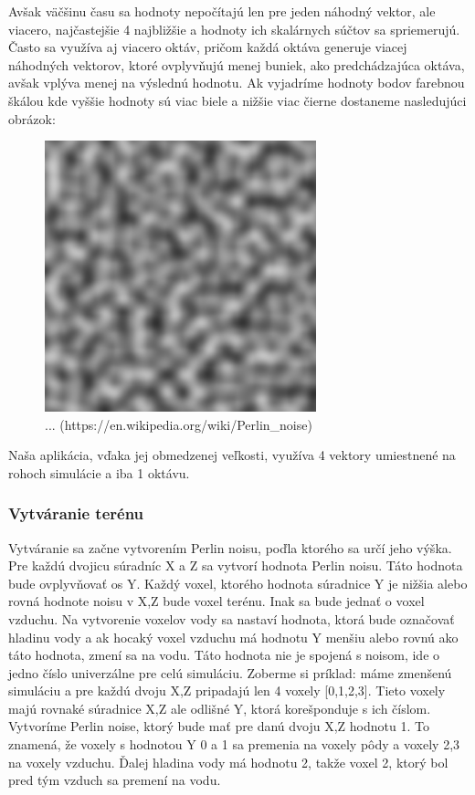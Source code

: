 \documentclass[12pt]{article}
\begin{document}
Avšak väčšinu času sa hodnoty nepočítajú len pre jeden náhodný vektor,
ale viacero, najčastejšie 4 najbližšie a hodnoty ich skalárnych súčtov
sa spriemerujú. Často sa využíva aj viacero oktáv, pričom každá oktáva generuje
viacej náhodných vektorov, ktoré ovplyvňujú menej buniek, ako predchádzajúca
oktáva, avšak vplýva menej na výslednú hodnotu. Ak vyjadríme hodnoty bodov
farebnou škálou kde vyššie hodnoty sú viac biele a nižšie viac čierne dostaneme
nasledujúci obrázok:

\begin{figure}[h]
	\centering
	\includegraphics[width=0.7\textwidth]{res/perlinov_sum_textura.png}
	\caption{... (https://en.wikipedia.org/wiki/Perlin\_noise)}
	\label{obr:perlinov sum textura}
\end{figure}

Naša aplikácia, vďaka jej obmedzenej veľkosti, využíva 4 vektory umiestnené
na rohoch simulácie a iba 1 oktávu.

\subsubsection{Vytváranie terénu}

Vytváranie sa začne vytvorením Perlin noisu, poďla ktorého sa určí jeho výška.
Pre každú dvojicu súradníc X a Z sa vytvorí hodnota Perlin noisu. Táto hodnota
bude ovplyvňovať os Y. Každý voxel, ktorého hodnota súradnice Y je nižšia alebo
rovná hodnote noisu v X,Z bude voxel terénu. Inak sa bude jednať o voxel
vzduchu. Na vytvorenie voxelov vody sa nastaví hodnota, ktorá bude označovať
hladinu vody a ak hocaký voxel vzduchu má hodnotu Y menšiu alebo rovnú ako táto
hodnota, zmení sa na vodu. Táto hodnota nie je spojená s noisom, ide o jedno
číslo univerzálne pre celú simuláciu. Zoberme si príklad: máme zmenšenú
simuláciu a pre každú dvoju X,Z pripadajú len 4 voxely [0,1,2,3]. Tieto voxely
majú rovnaké súradnice X,Z ale odlišné Y, ktorá korešponduje s ich číslom.
Vytvoríme Perlin noise, ktorý bude mať pre danú dvoju X,Z hodnotu 1. To
znamená, že voxely s hodnotou Y 0 a 1 sa premenia na voxely pôdy a voxely 2,3
na voxely vzduchu. Ďalej hladina vody má hodnotu 2, takže voxel 2, ktorý bol
pred tým vzduch sa premení na vodu.
\end{document}
